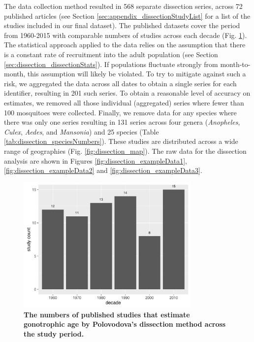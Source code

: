 \documentclass[12pt]{article}
\begin{document}
{The data collection method resulted in 568 separate dissection series, across 72 published articles (see Section \ref{sec:appendix_dissectionStudyList} for a list of the studies included in our final dataset). The published datasets cover the period from 1960-2015 with comparable numbers of studies across each decade (Fig. \ref{fig:dissection_timeSeries}). The statistical approach applied to the data relies on the assumption that there is a constant rate of recruitment into the adult population (see Section \ref{sec:dissection_dissectionStats}). If populations fluctuate strongly from month-to-month, this assumption will likely be violated. To try to mitigate against such a risk, we aggregated the data across all dates to obtain a single series for each identifier, resulting in 201 such series. To obtain a reasonable level of accuracy on estimates, we removed all those individual (aggregated) series where fewer than 100 mosquitoes were collected. Finally, we remove data for any species where there was only one series resulting in 131 series across four genera (\textit{Anopheles}, \textit{Culex}, \textit{Aedes}, and \textit{Mansonia}) and 25 species (Table \ref{tab:dissection_speciesNumbers}). These studies are distributed across a wide range of geographies (Fig. \ref{fig:dissection_map}). The raw data for the dissection analysis are shown in Figures \ref{fig:dissection_exampleData1}, \ref{fig:dissection_exampleData2} and \ref{fig:dissection_exampleData3}.


\begin{figure}[ht]
	\centerline{\includegraphics[width=0.8\textwidth]{./Figure_files/dissection_timeSeries.pdf}}
	\caption{\textbf{The numbers of published studies that estimate gonotrophic age by Polovodova's dissection method across the study period.}}\label{fig:dissection_timeSeries}
\end{figure}


}
\end{document}
